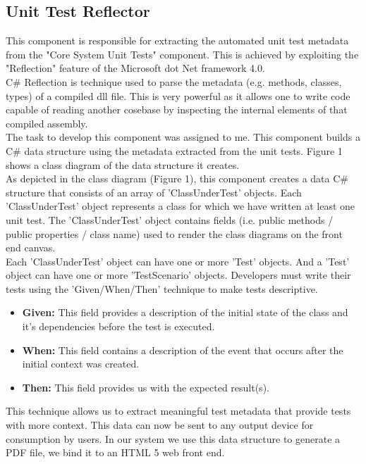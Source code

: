 \documentclass[a4paper,12pt]{article}
\begin{document}
\subsection{Unit Test Reflector} 
This component is responsible for extracting the automated unit test metadata from the "Core System Unit Tests" component. This is achieved by exploiting the "Reflection\cite{reflection}" feature of the Microsoft dot Net framework 4.0\cite{dotNetFramework}.\\
\linebreak
C\# Reflection is technique used to parse the metadata (e.g. methods, classes, types) of a compiled dll file. This is very powerful as it allows one to write code capable of reading another cosebase by inspecting the internal elements of that compiled assembly.\\
\linebreak
The task to develop this component was assigned to me. This component builds a C\# data structure using the metadata extracted from the unit tests. Figure 1 shows a class diagram of the data structure it creates.\\
\linebreak
As depicted in the class diagram (Figure 1), this component creates a data C\# structure that consists of an array of 'ClassUnderTest' objects. Each 'ClassUnderTest' object represents a class for which we have written at least one unit test. The 'ClassUnderTest' object contains fields (i.e. public methods / public properties / class name) used to render the class diagrams on the front end canvas.\\
\linebreak
Each 'ClassUnderTest' object can have one or more 'Test' objects. And a 'Test' object can have one or more 'TestScenario' objects. Developers must write their tests using the 'Given/When/Then'\cite{gwt} technique to make tests descriptive. 
\begin{itemize}
\item \textbf{Given:} This field provides a description of the initial state of the class and it's dependencies before the test is executed.
\item \textbf{When:} This field contains a description of the event that occurs after the initial  context was created.
\item \textbf{Then:} This field provides us with the expected result(s).
\end{itemize}  

This technique allows us to extract meaningful test metadata that provide tests with more context. This data can now be sent to any output device for consumption by users. In our system we use this data structure to generate a PDF file, we bind it to an HTML 5 web front end.
\end{document}
